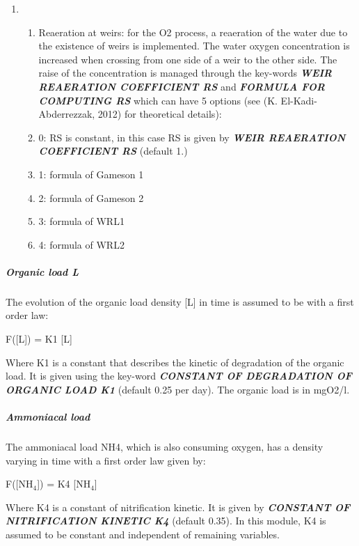 \documentclass{article} %
\begin{document}
\begin{enumerate}
\item \begin{enumerate}
\item  Reaeration at weirs: for the O2 process, a reaeration of the water due to the existence of weirs is implemented. The water oxygen concentration is increased when crossing from one side of a weir to the other side. The raise of the concentration is managed through the key-words \textbf{\textit{WEIR REAERATION COEFFICIENT RS}} and \textbf{\textit{FORMULA FOR COMPUTING RS}} which can have 5 options (see (K. El-Kadi-Abderrezzak, 2012) for theoretical details):

\item  0: RS is constant, in this case RS is given by \textbf{\textit{WEIR REAERATION COEFFICIENT RS }}(default 1.)

\item  1: formula of Gameson 1

\item  2: formula of Gameson 2

\item  3: formula of WRL1

\item  4: formula of WRL2
\end{enumerate}
\end{enumerate}




\subparagraph{  Organic load L}

 The evolution of the organic load density [L] in time is assumed to be with a first order law:

 F([L]) = K1 [L]

 Where K1 is a constant that describes the kinetic of degradation of the organic load. It is given using the key-word \textbf{\textit{CONSTANT OF DEGRADATION OF ORGANIC LOAD K1}} (default 0.25 per day).  The organic load is in mgO2/l.


\subparagraph{ Ammoniacal load}

 The ammoniacal load NH4, which is also consuming oxygen, has a density varying in time with a first order law given by:

 F([NH${}_{4}$]) = K4 [NH${}_{4}$]

 Where K4 is a constant of nitrification kinetic. It is given by \textbf{\textit{CONSTANT OF NITRIFICATION KINETIC K4}}\textit{ }(default 0.35). In this module, K4 is assumed to be constant and independent of remaining variables.
\end{document}
